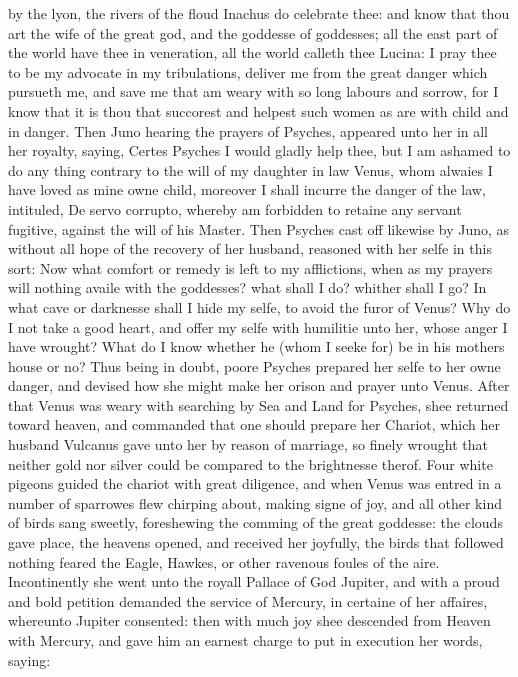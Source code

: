 by the lyon, the rivers of the floud Inachus do celebrate thee: and know that
thou art the wife of the great god, and the goddesse of goddesses; all the east
part of the world have thee in veneration, all the world calleth thee Lucina: I
pray thee to be my advocate in my tribulations, deliver me from the great
danger which pursueth me, and save me that am weary with so long labours and
sorrow, for I know that it is thou that succorest and helpest such women as are
with child and in danger. Then Juno hearing the prayers of Psyches, appeared
unto her in all her royalty, saying, Certes Psyches I would gladly help thee,
but I am ashamed to do any thing contrary to the will of my daughter in law
Venus, whom alwaies I have loved as mine owne child, moreover I shall incurre
the danger of the law, intituled, De servo corrupto, whereby am forbidden to
retaine any servant fugitive, against the will of his Master. Then Psyches cast
off likewise by Juno, as without all hope of the recovery of her husband,
reasoned with her selfe in this sort: Now what comfort or remedy is left to my
afflictions, when as my prayers will nothing availe with the goddesses? what
shall I do? whither shall I go? In what cave or darknesse shall I hide my
selfe, to avoid the furor of Venus? Why do I not take a good heart, and offer
my selfe with humilitie unto her, whose anger I have wrought? What do I know
whether he (whom I seeke for) be in his mothers house or no? Thus being in
doubt, poore Psyches prepared her selfe to her owne danger, and devised how she
might make her orison and prayer unto Venus. After that Venus was weary with
searching by Sea and Land for Psyches, shee returned toward heaven, and
commanded that one should prepare her Chariot, which her husband Vulcanus gave
unto her by reason of marriage, so finely wrought that neither gold nor silver
could be compared to the brightnesse therof. Four white pigeons guided the
chariot with great diligence, and when Venus was entred in a number of
sparrowes flew chirping about, making signe of joy, and all other kind of birds
sang sweetly, foreshewing the comming of the great goddesse: the clouds gave
place, the heavens opened, and received her joyfully, the birds that followed
nothing feared the Eagle, Hawkes, or other ravenous foules of the aire.
Incontinently she went unto the royall Pallace of God Jupiter, and with a proud
and bold petition demanded the service of Mercury, in certaine of her affaires,
whereunto Jupiter consented: then with much joy shee descended from Heaven with
Mercury, and gave him an earnest charge to put in execution her words, saying:

